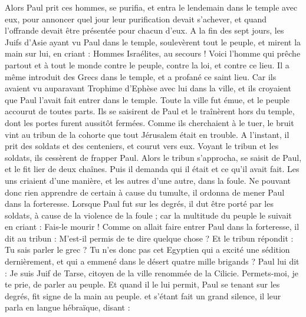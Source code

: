 \begin{multicols}{2}
{{Alors Paul prit ces hommes, se purifia, et entra le lendemain dans le temple avec eux, pour annoncer quel jour leur purification devait s'achever, et quand l'offrande devait être présentée pour chacun d'eux.
A la fin des sept jours, les Juifs d'Asie ayant vu Paul dans le temple, soulevèrent tout le peuple, et mirent la main sur lui,
en criant : Hommes Israélites, au secours ! Voici l'homme qui prêche partout et à tout le monde contre le peuple, contre la loi, et contre ce lieu. Il a même introduit des Grecs dans le temple, et a profané ce saint lieu.
Car ils avaient vu auparavant Trophime d'Ephèse avec lui dans la ville, et ils croyaient que Paul l'avait fait entrer dans le temple.
Toute la ville fut émue, et le peuple accourut de toutes parts. Ils se saisirent de Paul et le traînèrent hors du temple, dont les portes furent aussitôt fermées.
Comme ils cherchaient à le tuer, le bruit vint au tribun de la cohorte que tout Jérusalem était en trouble.
A l'instant, il prit des soldats et des centeniers, et courut vers eux. Voyant le tribun et les soldats, ils cessèrent de frapper Paul.
Alors le tribun s'approcha, se saisit de Paul, et le fit lier de deux chaînes. Puis il demanda qui il était et ce qu'il avait fait.
Les uns criaient d'une manière, et les autres d'une autre, dans la foule. Ne pouvant donc rien apprendre de certain à cause du tumulte, il ordonna de mener Paul dans la forteresse.
Lorsque Paul fut sur les degrés, il dut être porté par les soldats, à cause de la violence de la foule ;
car la multitude du peuple le suivait en criant : Fais-le mourir !
Comme on allait faire entrer Paul dans la forteresse, il dit au tribun : M'est-il permis de te dire quelque chose ? Et le tribun répondit : Tu sais parler le grec ?
Tu n'es donc pas cet Egyptien qui a excité une sédition dernièrement, et qui a emmené dans le désert quatre mille brigands ?
Paul lui dit : Je suis Juif de Tarse, citoyen de la ville renommée de la Cilicie. Permets-moi, je te prie, de parler au peuple.
Et quand il le lui permit, Paul se tenant sur les degrés, fit signe de la main au peuple. et s'étant fait un grand silence, il leur parla en langue hébraïque, disant :
}}
\end{multicols}
